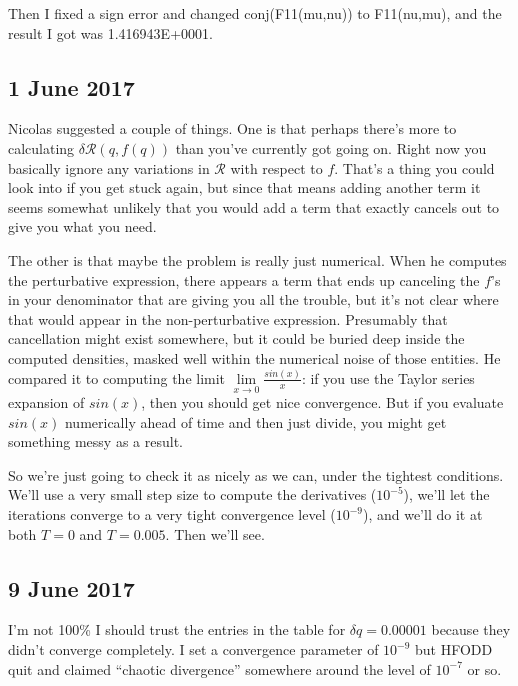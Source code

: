 \documentclass[]{report}
\begin{document}
Then I fixed a sign error and changed conj(F11(mu,nu)) to F11(nu,mu), and the result I got was 1.416943E+0001.

\subsection*{1 June 2017}

Nicolas suggested a couple of things. One is that perhaps there's more to calculating $\delta \mathcal{R}(q,f(q))$ than you've currently got going on. Right now you basically ignore any variations in $\mathcal{R}$ with respect to $f$. That's a thing you could look into if you get stuck again, but since that means adding another term it seems somewhat unlikely that you would add a term that exactly cancels out to give you what you need.

The other is that maybe the problem is really just numerical. When he computes the perturbative expression, there appears a term that ends up canceling the $f$'s in your denominator that are giving you all the trouble, but it's not clear where that would appear in the non-perturbative expression. Presumably that cancellation might exist somewhere, but it could be buried deep inside the computed densities, masked well within the numerical noise of those entities. He compared it to computing the limit $\lim\limits_{x\rightarrow0}\frac{sin(x)}{x}$: if you use the Taylor series expansion of $sin(x)$, then you should get nice convergence. But if you evaluate $sin(x)$ numerically ahead of time and then just divide, you might get something messy as a result.

So we're just going to check it as nicely as we can, under the tightest conditions. We'll use a very small step size to compute the derivatives ($10^{-5}$), we'll let the iterations converge to a very tight convergence level ($10^{-9}$), and we'll do it at both $T=0$ and $T=0.005$. Then we'll see.

\subsection*{9 June 2017}
I'm not 100\% I should trust the entries in the table for $\delta q=0.00001$ because they didn't converge completely. I set a convergence parameter of $10^{-9}$ but HFODD quit and claimed ``chaotic divergence'' somewhere around the level of $10^{-7}$ or so.
\end{document}
